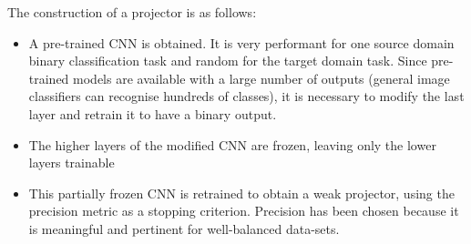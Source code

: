 \documentclass[11 pt]{article}
\begin{document}
\begin{samepage}
  The construction of a projector is as follows: \medskip
    \begin{itemize}
      \item A pre-trained CNN is obtained. It is very performant for one source domain binary classification task and random for the target domain task. Since pre-trained models are available with a large number of outputs (general image classifiers can recognise hundreds of classes), it is necessary to modify the last layer and retrain it to have a binary output.
      \nopagebreak
      \item The higher layers of the modified CNN are frozen, leaving only the lower layers trainable 
      \nopagebreak
      \item This partially frozen CNN is retrained to obtain a weak projector, using the precision metric as a stopping criterion. Precision has been chosen because it is meaningful and pertinent for well-balanced data-sets.
    \end{itemize}
  \end{samepage}
\end{document}
